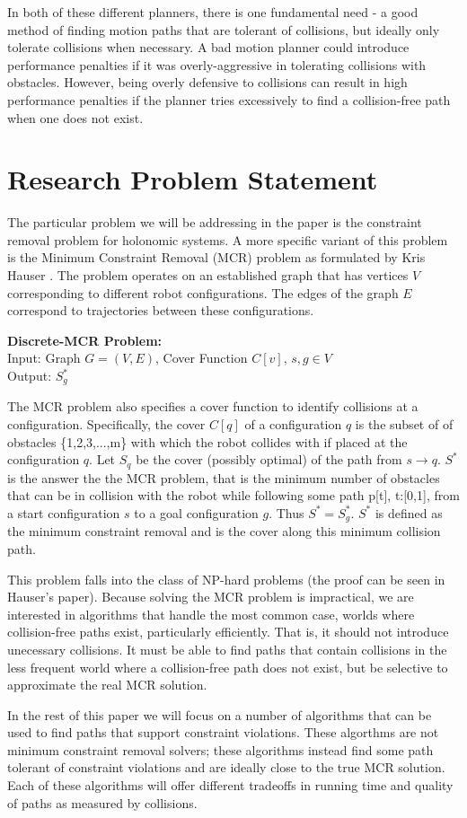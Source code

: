 In both of these different planners, there is one fundamental need - a good method of finding motion paths that are tolerant of collisions, but ideally only tolerate collisions when necessary. A bad motion planner could introduce performance penalties if it was overly-aggressive in tolerating collisions with obstacles. However, being overly defensive to collisions can result in high performance penalties if the planner tries excessively to find a collision-free path when one does not exist. 

\section{Research Problem Statement} \label{intro:statement}
The particular problem we will be addressing in the paper is the constraint removal problem for holonomic systems. A more specific variant of this problem is the Minimum Constraint Removal (MCR) problem as formulated by Kris Hauser \cite{hauser:mcr}. The problem operates on an established graph that has vertices $V$ corresponding to different robot configurations. The edges of the graph $E$ correspond to trajectories between these configurations. 
\newline

\noindent
{\bf{Discrete-MCR Problem:}}\\
Input: Graph $G = (V,E)$, Cover Function $C[v]$, $s,g \in V$  \\
Output: $S^{*}_g$
\newline

The MCR problem also specifies a cover function to identify collisions at a configuration. Specifically, the cover $C[q]$ of a configuration $q$ is the subset of of obstacles \{1,2,3,...,m\} with which the robot collides with if placed at the configuration $q$. Let $S_q$ be the cover (possibly optimal) of the path from $s \rightarrow q$. $S^{*}$ is the answer the the MCR problem, that is the minimum number of obstacles that can be in collision with the robot while following some path p[t], t:[0,1], from a start configuration $s$ to a goal configuration $g$. Thus $S^{*} = S^{*}_g$. $S^{*}$ is defined as the minimum constraint removal and is the cover along this minimum collision path. 

This problem falls into the class of NP-hard problems (the proof can be seen in Hauser's paper). Because solving the MCR problem is impractical, we are interested in algorithms that handle the most common case, worlds where collision-free paths exist, particularly efficiently. That is, it should not introduce unecessary collisions. It must be able to find paths that contain collisions in the less frequent world where a collision-free path does not exist, but be selective to approximate the real MCR solution.

In the rest of this paper we will focus on a number of algorithms that can be used to find paths that support constraint violations. These algorthms are not minimum constraint removal solvers; these algorithms instead find some path tolerant of constraint violations and are ideally close to the true MCR solution. Each of these algorithms will offer different tradeoffs in running time and quality of paths as measured by collisions.
